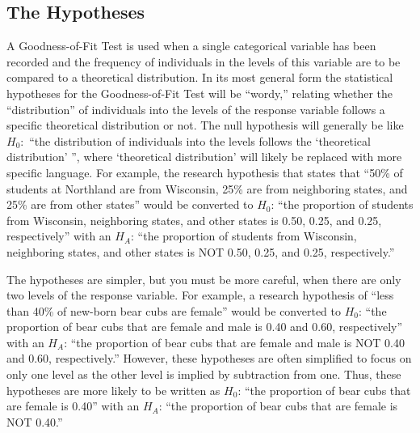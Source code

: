 \documentclass[10pt,openany]{book}\usepackage[]{graphicx}\usepackage[]{color}
\begin{document}
\subsection{The Hypotheses}
\vspace{-12pt}
A Goodness-of-Fit Test is used when a single categorical variable has been recorded and the frequency of individuals in the levels of this variable are to be compared to a theoretical distribution.  In its most general form the statistical hypotheses for the Goodness-of-Fit Test will be ``wordy,'' relating whether the ``distribution'' of individuals into the levels of the response variable follows a specific theoretical distribution or not.  The null hypothesis will generally be like $H_{0}:$ ``the distribution of individuals into the levels follows the `theoretical distribution' '', where `theoretical distribution' will likely be replaced with more specific language.  For example, the research hypothesis that states that ``50\% of students at Northland are from Wisconsin, 25\% are from neighboring states, and 25\% are from other states'' would be converted to $H_{0}$: ``the proportion of students from Wisconsin, neighboring states, and other states is 0.50, 0.25, and 0.25, respectively'' with an $H_{A}$: ``the proportion of students from Wisconsin, neighboring states, and other states is NOT 0.50, 0.25, and 0.25, respectively.''


The hypotheses are simpler, but you must be more careful, when there are only two levels of the response variable.  For example, a research hypothesis of ``less than 40\% of new-born bear cubs are female'' would be converted to $H_{0}$: ``the proportion of bear cubs that are female and male is 0.40 and 0.60, respectively'' with an $H_{A}$: ``the proportion of bear cubs that are female and male is NOT 0.40 and 0.60, respectively.''  However, these hypotheses are often simplified to focus on only one level as the other level is implied by subtraction from one.  Thus, these hypotheses are more likely to be written as $H_{0}$: ``the proportion of bear cubs that are female is 0.40'' with an $H_{A}$: ``the proportion of bear cubs that are female is NOT 0.40.''

\end{document}

